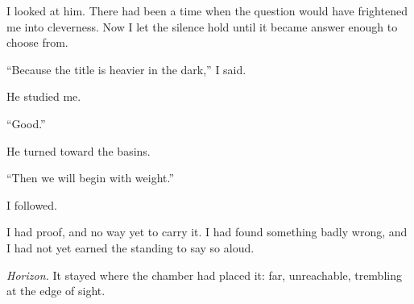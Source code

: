 I looked at him. There had been a time when the question would have frightened me into cleverness. Now I let the silence hold until it became answer enough to choose from.\par

``Because the title is heavier in the dark,'' I said.\par

He studied me.\par

``Good.''\par

He turned toward the basins.\par

``Then we will begin with weight.''\par

I followed.\par

I had proof, and no way yet to carry it. I had found something badly wrong, and I had not yet earned the standing to say so aloud.\par

\textit{Horizon.} It stayed where the chamber had placed it: far, unreachable, trembling at the edge of sight.\par

\ornament
